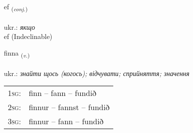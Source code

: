 \documentclass[frontgrid, backgrid]{flacards}\usepackage[]{graphicx}\usepackage[]{xcolor}
\begin{document}
\renewcommand{\blhead}{\vskip5pt {\small\bfseries\footnotesize Samtenging | сполучник }}
\renewcommand{\bcfoot}{\vskip5pt \hspace{2pt}{\small\bfseries\footnotesize 1K}}


{ef \small{\textsubscript{(\textit{conj.})}} \\[1ex]
\textphonetic{[ɛːf]} \\
ukr.: \emph{якщо} \\  [2ex]
ef (Indeclinable)}

\renewcommand{\flhead}{\vskip5pt \fboxsep=0pt {\small\bfseries\footnotesize Sagnorð | дієслово}}
\renewcommand{\fcfoot}{\vskip5pt \fboxsep=0pt \hspace{2pt}{\small\bfseries\footnotesize 1K}}

\renewcommand{\blhead}{\vskip5pt {\small\bfseries\footnotesize Sagnorð | дієслово }}
\renewcommand{\bcfoot}{\vskip5pt \hspace{2pt}{\small\bfseries\footnotesize 1K}}


{finna \small{\textsubscript{(\textit{v.})}} \\[1ex] %
\textphonetic{[fɪna]} \\
ukr.: \emph{знайти щось (когось); відчувати; сприйняття; значення} \\  [2ex]
\renewcommand*{\arraystretch}{0.8}
\begin{tabular}{p{1cm}l}
\textsc{1sg}: & finn -- fann -- fundið \\ 
\textsc{2sg}: & finnur -- fannst -- fundið \\ 
\textsc{3sg}: & finnur -- fann -- fundið \\ 
\end{tabular}
}


\renewcommand{\flhead}{\vskip5pt \fboxsep=0pt {\small\bfseries\footnotesize Forsetning | прийменник}}
\renewcommand{\fcfoot}{\vskip5pt \fboxsep=0pt \hspace{2pt}{\small\bfseries\footnotesize 1K}}
\end{document}

